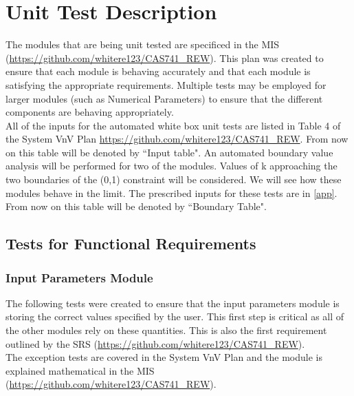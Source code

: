 \documentclass[12pt, titlepage]{article}
\begin{document}

\section{Unit Test Description} \label{testDescription} 

The modules that are being unit tested are specificed in the MIS 
(\url{https://github.com/whitere123/CAS741_REW}). This plan was created to 
ensure that each module is behaving accurately and that each module is 
satisfying the appropriate requirements.  Multiple tests may be employed for 
larger modules (such as Numerical Parameters) to ensure that the different 
components are behaving appropriately. \\ 

All of the inputs for the automated white box unit tests are listed in Table 4 
of the System VnV Plan \url{https://github.com/whitere123/CAS741_REW}. From now 
on this table will be denoted by ``Input table". An automated boundary value 
analysis will be performed for two of the modules. Values of k approaching the 
two boundaries of the (0,1) constraint will be considered. We will see how 
these modules behave in the limit. The prescribed inputs for these tests are in 
\ref{app}. From now on this table will be denoted by ``Boundary Table". \\

\subsection{Tests for Functional Requirements}


\subsubsection{Input Parameters Module}

The following tests were created to ensure that the input parameters module is 
storing the correct values specified by the user. This first step is critical 
as all of the other modules rely on these quantities. This is also the first 
requirement outlined by the SRS 
(\url{https://github.com/whitere123/CAS741_REW}). \\
The exception tests are covered in the System 
VnV Plan and the module is explained mathematical in the 
MIS (\url{https://github.com/whitere123/CAS741_REW}). \\
\end{document}
